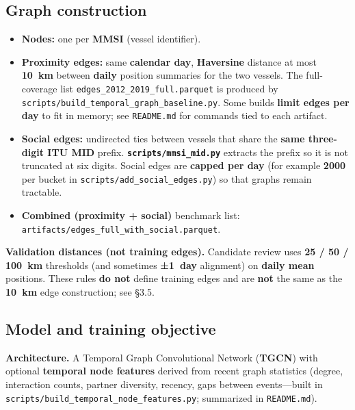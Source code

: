 \documentclass[
]{article}
\providecommand{\tightlist}{%
  \setlength{\itemsep}{0pt}\setlength{\parskip}{0pt}}
\begin{document}
\subsection{Graph construction}\label{graph-construction}

\begin{itemize}
\tightlist
\item
  \textbf{Nodes:} one per \textbf{MMSI} (vessel identifier).\\
\item
  \textbf{Proximity edges:} same \textbf{calendar day},
  \textbf{Haversine} distance at most \textbf{10~km} between
  \textbf{daily} position summaries for the two vessels. The
  full-coverage list \texttt{edges\_2012\_2019\_full.parquet} is
  produced by \texttt{scripts/build\_temporal\_graph\_baseline.py}. Some
  builds \textbf{limit edges per day} to fit in memory; see
  \texttt{README.md} for commands tied to each artifact.\\
\item
  \textbf{Social edges:} undirected ties between vessels that share the
  \textbf{same three-digit ITU MID} prefix.
  \textbf{\texttt{scripts/mmsi\_mid.py}} extracts the prefix so it is
  not truncated at six digits. Social edges are \textbf{capped per day}
  (for example \textbf{2000} per bucket in
  \texttt{scripts/add\_social\_edges.py}) so that graphs remain
  tractable.\\
\item
  \textbf{Combined (proximity + social)} benchmark list:
  \texttt{artifacts/edges\_full\_with\_social.parquet}.
\end{itemize}

\textbf{Validation distances (not training edges).} Candidate review
uses \textbf{25 / 50 / 100~km} thresholds (and sometimes \textbf{±1~day}
alignment) on \textbf{daily mean} positions. These rules \textbf{do not}
define training edges and are \textbf{not} the same as the
\textbf{10~km} edge construction; see §3.5.

\subsection{Model and training
objective}\label{model-and-training-objective}

\textbf{Architecture.} A Temporal Graph Convolutional Network
(\textbf{TGCN}) with optional \textbf{temporal node features} derived
from recent graph statistics (degree, interaction counts, partner
diversity, recency, gaps between events---built in
\texttt{scripts/build\_temporal\_node\_features.py}; summarized in
\texttt{README.md}).
\end{document}
